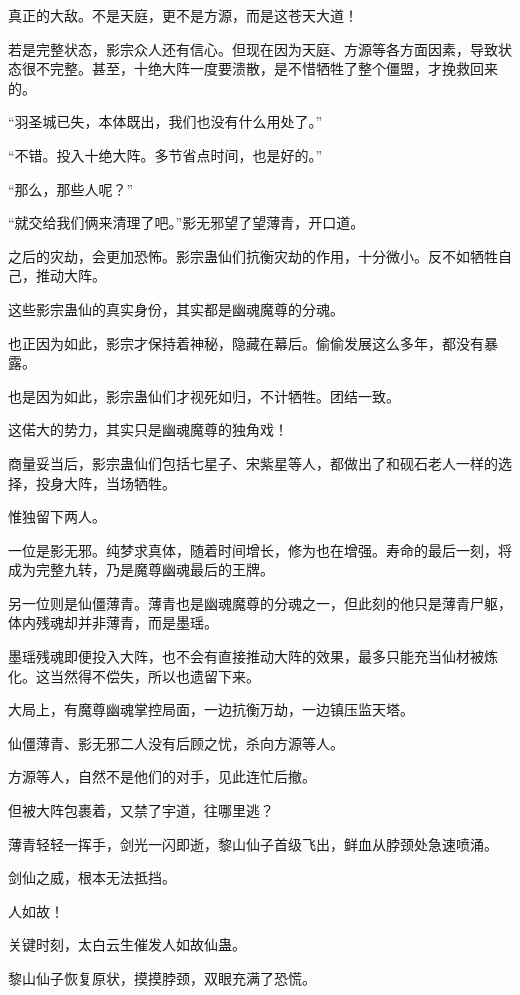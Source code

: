 \begin{this_body}
真正的大敌。不是天庭，更不是方源，而是这苍天大道！

若是完整状态，影宗众人还有信心。但现在因为天庭、方源等各方面因素，导致状态很不完整。甚至，十绝大阵一度要溃散，是不惜牺牲了整个僵盟，才挽救回来的。

“羽圣城已失，本体既出，我们也没有什么用处了。”

“不错。投入十绝大阵。多节省点时间，也是好的。”

“那么，那些人呢？”

“就交给我们俩来清理了吧。”影无邪望了望薄青，开口道。

之后的灾劫，会更加恐怖。影宗蛊仙们抗衡灾劫的作用，十分微小。反不如牺牲自己，推动大阵。

这些影宗蛊仙的真实身份，其实都是幽魂魔尊的分魂。

也正因为如此，影宗才保持着神秘，隐藏在幕后。偷偷发展这么多年，都没有暴露。

也是因为如此，影宗蛊仙们才视死如归，不计牺牲。团结一致。

这偌大的势力，其实只是幽魂魔尊的独角戏！

商量妥当后，影宗蛊仙们包括七星子、宋紫星等人，都做出了和砚石老人一样的选择，投身大阵，当场牺牲。

惟独留下两人。

一位是影无邪。纯梦求真体，随着时间增长，修为也在增强。寿命的最后一刻，将成为完整九转，乃是魔尊幽魂最后的王牌。

另一位则是仙僵薄青。薄青也是幽魂魔尊的分魂之一，但此刻的他只是薄青尸躯，体内残魂却并非薄青，而是墨瑶。

墨瑶残魂即便投入大阵，也不会有直接推动大阵的效果，最多只能充当仙材被炼化。这当然得不偿失，所以也遗留下来。

大局上，有魔尊幽魂掌控局面，一边抗衡万劫，一边镇压监天塔。

仙僵薄青、影无邪二人没有后顾之忧，杀向方源等人。

方源等人，自然不是他们的对手，见此连忙后撤。

但被大阵包裹着，又禁了宇道，往哪里逃？

薄青轻轻一挥手，剑光一闪即逝，黎山仙子首级飞出，鲜血从脖颈处急速喷涌。

剑仙之威，根本无法抵挡。

人如故！

关键时刻，太白云生催发人如故仙蛊。

黎山仙子恢复原状，摸摸脖颈，双眼充满了恐慌。


\end{this_body}
